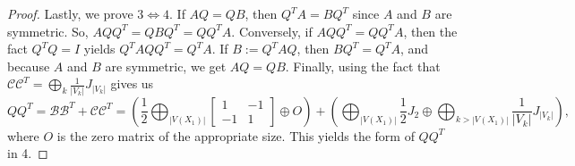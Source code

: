 \documentclass[12pt,a4paper]{article}
\begin{document}
\begin{proof}
Lastly, we prove $3\Leftrightarrow 4$.
If $AQ=QB$, then $Q^TA=BQ^T$ since $A$ and $B$ are symmetric. So, $AQQ^T=QBQ^T=QQ^TA$. Conversely, if $AQQ^T=QQ^TA$, then the fact $Q^TQ=I$ yields $Q^TAQQ^T=Q^TA$. If $B:=Q^TAQ$, then $BQ^T=Q^TA$, and because $A$ and $B$ are symmetric, we get $AQ=QB$. Finally, %
using the fact that $\mathcal{C}\mathcal{C}^T=\displaystyle\bigoplus_{k}\frac{1}{|V_k|}J_{|V_k|}$ gives us
\begin{equation*}
QQ^T%
=\mathcal{B}\mathcal{B}^T+\mathcal{C}\mathcal{C}^T=\left(\frac{1}{2}\bigoplus_{|V(X_1)|}\begin{bmatrix}1&-1\\-1&1\end{bmatrix}\oplus O\right)+\left(\bigoplus_{|V(X_1)|}\frac{1}{2}J_2\oplus \bigoplus_{k>|V(X_1)|} \frac{1}{|V_k|}J_{|V_k|}\right),
\end{equation*}
where $O$ is the zero matrix of the appropriate size. This yields the form of $QQ^T$ in 4.


\end{proof}
\end{document}
